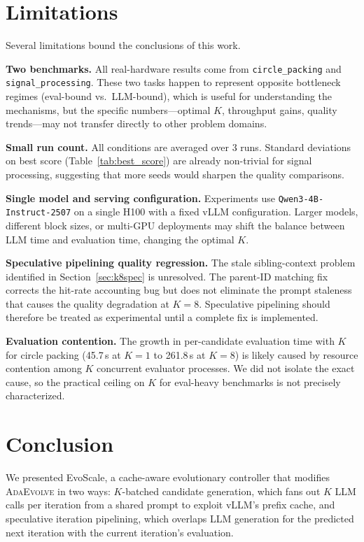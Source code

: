 \documentclass{article}
\newcommand{\adaev}{\textsc{AdaEvolve}}
\begin{document}
\section{Limitations}

Several limitations bound the conclusions of this work.

\textbf{Two benchmarks.} All real-hardware results come from
\texttt{circle\_packing} and \texttt{signal\_processing}. These two
tasks happen to represent opposite bottleneck regimes (eval-bound vs.\
LLM-bound), which is useful for understanding the mechanisms, but the
specific numbers---optimal $K$, throughput gains, quality trends---may
not transfer directly to other problem domains.

\textbf{Small run count.} All conditions are averaged over 3 runs.
Standard deviations on best score (Table~\ref{tab:best_score}) are
already non-trivial for signal processing, suggesting that more seeds
would sharpen the quality comparisons.

\textbf{Single model and serving configuration.} Experiments use
\texttt{Qwen3-4B-Instruct-2507} on a single H100 with a fixed vLLM
configuration. Larger models, different block sizes, or multi-GPU
deployments may shift the balance between LLM time and evaluation time,
changing the optimal $K$.

\textbf{Speculative pipelining quality regression.} The stale
sibling-context problem identified in Section~\ref{sec:k8spec} is
unresolved. The parent-ID matching fix corrects the hit-rate accounting
bug but does not eliminate the prompt staleness that causes the quality
degradation at $K{=}8$. Speculative pipelining should therefore be
treated as experimental until a complete fix is implemented.

\textbf{Evaluation contention.} The growth in per-candidate evaluation
time with $K$ for circle packing (45.7\,s at $K{=}1$ to 261.8\,s at
$K{=}8$) is likely caused by resource contention among $K$ concurrent
evaluator processes. We did not isolate the exact cause, so the
practical ceiling on $K$ for eval-heavy benchmarks is not precisely
characterized.


\section{Conclusion}

We presented EvoScale, a cache-aware evolutionary controller that
modifies \adaev{} in two ways: $K$-batched candidate generation, which
fans out $K$ LLM calls per iteration from a shared prompt to exploit
vLLM's prefix cache, and speculative iteration pipelining, which
overlaps LLM generation for the predicted next iteration with the
current iteration's evaluation.
\end{document}
